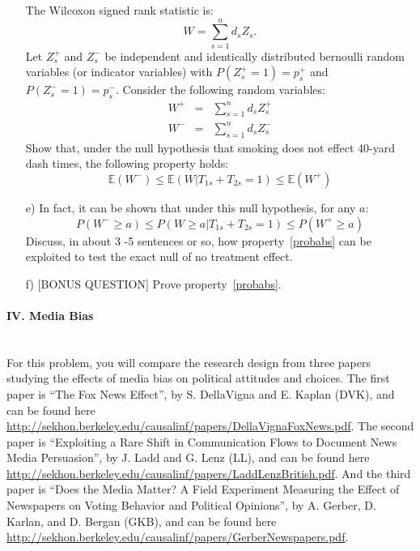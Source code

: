\documentclass{article}
\newcommand{\E}[0]{\mathbb{E}}
\begin{document}
\begin{itemize}
          The Wilcoxon signed rank statistic is:
          $$
            W = \sum_{s=1}^n d_sZ_s.
          $$
          Let $Z^+_s$ and $Z^-_s$ be independent and identically distributed 
          bernoulli random variables (or indicator variables) with $P(Z^+_s = 1) = p^+_s$
          and $P(Z^-_s = 1) = p^-_s$.
          Consider the following random variables:
          \begin{eqnarray*}
            W^+ &=& \sum_{s=1}^n d_s Z^+_s \\
            W^- & = & \sum_{s=1}^n d_sZ^-_s
          \end{eqnarray*}
          Show that, under the null hypothesis that smoking does not effect 40-yard dash times, 
          the following property holds:
          $$
           \E(W^-)\leq  \E(W| T_{1s} + T_{2s} =1) \leq \E(W^+) 
          $$
        \item[e)]
          In fact, it can be shown that under this null hypothesis, for any $a$:
          \begin{equation}
            P(W^- \geq a) \leq P(W \geq a | T_{1s} + T_{2s} = 1) \leq P(W^+ \geq a)
            \label{probabs}
          \end{equation}
          Discuss, in about 3 -5 sentences or so, how property~\eqref{probabs} can be
          exploited to test the exact null of no treatment effect. 
        \item[f)] [BONUS QUESTION]
          Prove property~\eqref{probabs}. 
      \end{itemize}

\paragraph{\Large IV. Media Bias \\ \\}

For this problem, you will compare the research design from three
papers studying the effects of media bias on political attitudes and
choices.  The first paper is ``The Fox News Effect'', by S.
DellaVigna and E. Kaplan (DVK), and can be found here
\url{http://sekhon.berkeley.edu/causalinf/papers/DellaVignaFoxNews.pdf}. The
second paper is ``Exploiting a Rare Shift in Communication Flows to
Document News Media Persuasion'', by J. Ladd and G. Lenz (LL),
and can be found here
\url{http://sekhon.berkeley.edu/causalinf/papers/LaddLenzBritish.pdf}. And
the third paper is ``Does the Media Matter? A Field Experiment
Measuring the Effect of Newspapers on Voting Behavior and Political
Opinions'', by A. Gerber, D. Karlan, and D. Bergan (GKB), and
can be found here
\url{http://sekhon.berkeley.edu/causalinf/papers/GerberNewspapers.pdf}.
\end{document}
